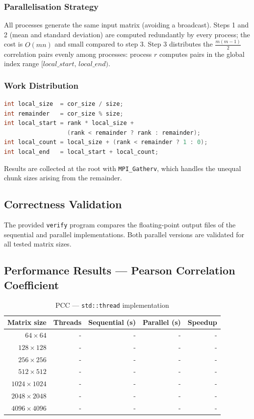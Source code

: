 \documentclass[11pt,a4paper]{article}
\begin{document}
\subsubsection{Parallelisation Strategy}

All processes generate the same input matrix (avoiding a broadcast). Steps 1 and 2 (mean and
standard deviation) are computed redundantly by every process; the cost is $O(mn)$ and small
compared to step 3. Step 3 distributes the $\frac{m(m-1)}{2}$ correlation pairs evenly among
processes: process $r$ computes pairs in the global index range
$[\textit{local\_start},\,\textit{local\_end})$.

\subsubsection{Work Distribution}

\begin{lstlisting}[language=C, caption=MPI work distribution for PCC]
int local_size  = cor_size / size;
int remainder   = cor_size % size;
int local_start = rank * local_size +
                  (rank < remainder ? rank : remainder);
int local_count = local_size + (rank < remainder ? 1 : 0);
int local_end   = local_start + local_count;
\end{lstlisting}

Results are collected at the root with \texttt{MPI\_Gatherv}, which handles the unequal chunk
sizes arising from the remainder.

\subsection{Correctness Validation}

The provided \texttt{verify} program compares the floating-point output files of the sequential
and parallel implementations. Both parallel versions are validated for all tested matrix sizes.

\subsection{Performance Results --- Pearson Correlation Coefficient}

\begin{table}[h]
\centering
\begin{tabular}{|r|r|r|r|r|}
\hline
\textbf{Matrix size} & \textbf{Threads} & \textbf{Sequential (s)} & \textbf{Parallel (s)} & \textbf{Speedup} \\
\hline
$64 \times 64$     & - & - & - & - \\
$128 \times 128$   & - & - & - & - \\
$256 \times 256$   & - & - & - & - \\
$512 \times 512$   & - & - & - & - \\
$1024 \times 1024$ & - & - & - & - \\
$2048 \times 2048$ & - & - & - & - \\
$4096 \times 4096$ & - & - & - & - \\
\hline
\end{tabular}
\caption{PCC --- \texttt{std::thread} implementation}
\end{table}
\end{document}
